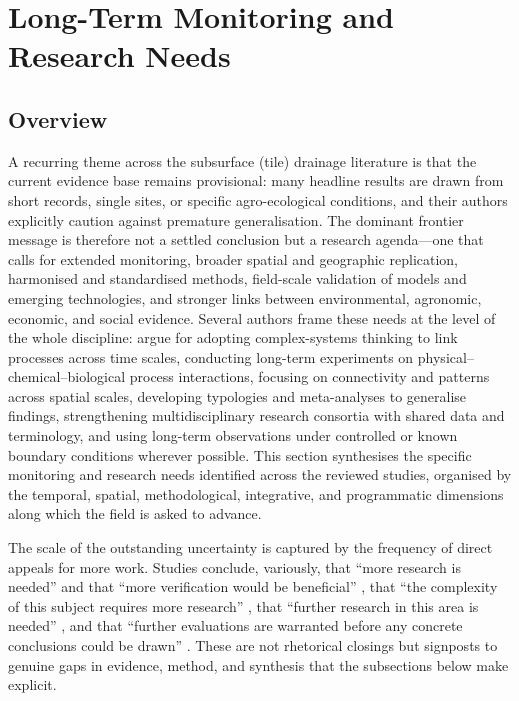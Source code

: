 \documentclass[11pt]{article}
\begin{document}
\section*{Long-Term Monitoring and Research Needs}

\subsection{Overview}

A recurring theme across the subsurface (tile) drainage literature is that the current evidence base remains provisional: many headline results are drawn from short records, single sites, or specific agro-ecological conditions, and their authors explicitly caution against premature generalisation. The dominant frontier message is therefore not a settled conclusion but a research agenda---one that calls for extended monitoring, broader spatial and geographic replication, harmonised and standardised methods, field-scale validation of models and emerging technologies, and stronger links between environmental, agronomic, economic, and social evidence. Several authors frame these needs at the level of the whole discipline: \textcite{Rogger2017} argue for adopting complex-systems thinking to link processes across time scales, conducting long-term experiments on physical--chemical--biological process interactions, focusing on connectivity and patterns across spatial scales, developing typologies and meta-analyses to generalise findings, strengthening multidisciplinary research consortia with shared data and terminology, and using long-term observations under controlled or known boundary conditions wherever possible. This section synthesises the specific monitoring and research needs identified across the reviewed studies, organised by the temporal, spatial, methodological, integrative, and programmatic dimensions along which the field is asked to advance.

The scale of the outstanding uncertainty is captured by the frequency of direct appeals for more work. Studies conclude, variously, that ``more research is needed'' and that ``more verification would be beneficial'' \parencite{SHALIT1995}, that ``the complexity of this subject requires more research'' \parencite{Malone2014}, that ``further research in this area is needed'' \parencite{Woo2023}, and that ``further evaluations are warranted before any concrete conclusions could be drawn'' \parencite{GUPTA1993}. These are not rhetorical closings but signposts to genuine gaps in evidence, method, and synthesis that the subsections below make explicit.
\end{document}
